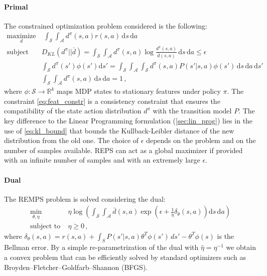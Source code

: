  \paragraph{Primal} The constrained optimization problem considered is the following:
 \begin{align}
 	\underset{d}{\text{maximize}} & \; \int_{\mathcal{S}} \int_{\mathcal{A}} d^\pi (s,a) r(s,a) \, \mathrm{d}s \, \mathrm{d}a \\
	\text{subject to}\; & D_{KL}(d^\pi | | \bar{d}) = \int_{\mathcal{S}} \int_{\mathcal{A}} d^\pi(s, a) \log \frac{d^\pi(s,a)}{\bar{d}(s,a)} \, \mathrm{d}s \, \mathrm{d}a \leq \epsilon \label{eq:kl_bound} \\
	 	& \int_{\mathcal{S}} d^\pi(s') \phi(s') \mathrm{d}s' = \int_{\mathcal{S}}\int_{\mathcal{A}} \int_{\mathcal{S}} d^{\pi}(s,a) P(s' | s, a)\phi(s') \, \mathrm{d}s \, \mathrm{d}a \, \mathrm{d}s' \label{eq:feat_constr}\\
	 	& \int_{\mathcal{S}} \int_{\mathcal{A}} d^\pi(s,a) \, \mathrm{d}s \, \mathrm{d}a  = 1 \label{eq:distr_constr} \, ,
 \end{align}
where $\phi : \mathcal{S} \rightarrow \mathbb{R}^k$ maps MDP states to stationary features under policy $\pi$. The constraint \cref{eq:feat_constr} is a consistency constraint that ensures the compatibility of the state action distribution $d^\pi$ with the transition model $P$.
The key difference to the Linear Programming formulation (\cref{sec:lin_prog}) lies in the use of \cref{eq:kl_bound} that bounds the Kullback-Leibler distance of the new distribution from the old one.
The choice of $\epsilon$ depends on the problem and on the number of samples available. \newline
REPS can act as a global maximizer if provided with an infinite number of samples and with an extremely large $\epsilon$.
 \paragraph{Dual} The REMPS problem is solved considering the dual:
 \begin{align}
 	\min_{\theta, \eta} \; & \eta \log \left( \int_\mathcal{S} \int_{\mathcal{A}} \bar{d}(s,a) \exp\left( \epsilon + \frac{1}{\eta}\delta_\theta(s,a) \right) \mathrm{d}s \, \mathrm{d}a \right) \\
 	\text{subject to} \; & \eta \geq 0 \, ,
 \end{align}
where $\delta_\theta(s,a) = r(s,a) + \int_S P(s' | s,a) \theta^T \phi(s') \, ds' - \theta^T \phi(s)$ is the Bellman error. 
By a simple re-parametrization of the dual with $\hat{\eta} = \eta^{-1}$ we obtain a convex problem that can be efficiently solved by standard optimizers such as Broyden–Fletcher–Goldfarb–Shannon (BFGS).

